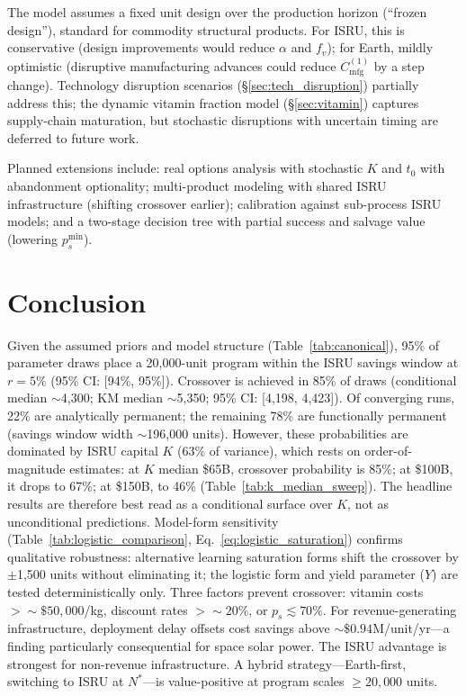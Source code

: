 \documentclass[5p,twocolumn]{elsarticle}
\begin{document}
The model assumes a fixed unit design over the production horizon (``frozen design''), standard for commodity structural products. For ISRU, this is conservative (design improvements would reduce $\alpha$ and $f_v$); for Earth, mildly optimistic (disruptive manufacturing advances could reduce $C_{\mathrm{mfg}}^{(1)}$ by a step change). Technology disruption scenarios (\S\ref{sec:tech_disruption}) partially address this; the dynamic vitamin fraction model (\S\ref{sec:vitamin}) captures supply-chain maturation, but stochastic disruptions with uncertain timing are deferred to future work.

Planned extensions include: real options analysis with stochastic $K$ and $t_0$ with abandonment optionality; multi-product modeling with shared ISRU infrastructure (shifting crossover earlier); calibration against sub-process ISRU models; and a two-stage decision tree with partial success and salvage value (lowering $p_s^{\min}$).

\section{Conclusion}
\label{sec:conclusion}

Given the assumed priors and model structure (Table~\ref{tab:canonical}), 95\% of parameter draws place a 20{,}000-unit program within the ISRU savings window at $r = 5\%$ (95\% CI: [94\%, 95\%]). Crossover is achieved in 85\% of draws (conditional median ${\sim}$4{,}300; KM median ${\sim}$5{,}350; 95\% CI: [4{,}198, 4{,}423]). Of converging runs, 22\% are analytically permanent; the remaining 78\% are functionally permanent (savings window width ${\sim}$196{,}000 units). However, these probabilities are dominated by ISRU capital $K$ (63\% of variance), which rests on order-of-magnitude estimates: at $K$ median \$65B, crossover probability is 85\%; at \$100B, it drops to 67\%; at \$150B, to 46\% (Table~\ref{tab:k_median_sweep}). The headline results are therefore best read as a conditional surface over $K$, not as unconditional predictions. Model-form sensitivity (Table~\ref{tab:logistic_comparison}, Eq.~\ref{eq:logistic_saturation}) confirms qualitative robustness: alternative learning saturation forms shift the crossover by $\pm$1{,}500 units without eliminating it; the logistic form and yield parameter ($Y$) are tested deterministically only. Three factors prevent crossover: vitamin costs $> {\sim}\$50{,}000$/kg, discount rates $> {\sim}20\%$, or $p_s \lesssim 70\%$. For revenue-generating infrastructure, deployment delay offsets cost savings above ${\sim}\$0.94$M/unit/yr---a finding particularly consequential for space solar power. The ISRU advantage is strongest for non-revenue infrastructure. A hybrid strategy---Earth-first, switching to ISRU at $N^*$---is value-positive at program scales $\geq 20{,}000$ units.
\end{document}
